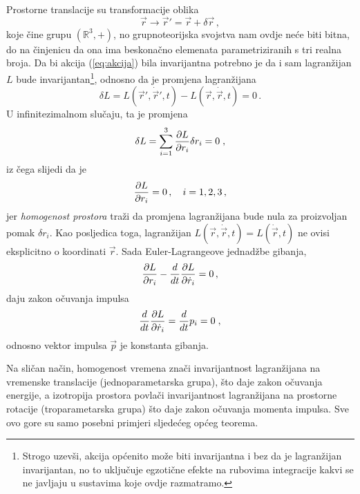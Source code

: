 Prostorne translacije su transformacije oblika
\begin{equation}
\vec{r}\to\vec{r}'=\vec{r}+\delta\vec{r} \,,
\end{equation}
koje čine grupu $(\mathbb{R}^{3},+)$, no grupnoteorijska svojstva nam ovdje
neće biti bitna, do na činjenicu da ona ima beskonačno elemenata parametriziranih
s tri realna broja. Da bi akcija (\ref{eq:akcija}) bila invarijantna potrebno
je da i sam lagranžijan $L$  bude invarijantan\footnote{Strogo uzevši, akcija
    općenito može biti invarijantna i bez da je lagranžijan invarijantan, no to uključuje
    egzotične efekte na rubovima integracije kakvi se ne javljaju u sustavima
    koje ovdje razmatramo.}, odnosno da je promjena lagranžijana
\begin{equation}
 \delta L = L(\vec{r}', \dot{\vec{r}}', t) -  L(\vec{r}, \dot{\vec{r}}, t)
 =0 \,.
\end{equation}
U infinitezimalnom slučaju, ta je promjena
\begin{equation}
    \delta L =  \sum_{i=1}^{3} \frac{\partial L}{\partial r_i} \delta r_i =0 \;,
\end{equation}
iz čega slijedi da je
\begin{equation}
 \frac{\partial L}{\partial r_i}=0 \,, \quad i=1,2,3 \,,
\end{equation}
jer \emph{homogenost prostora} traži da promjena lagranžijana bude nula
za proizvoljan pomak $\delta r_i$.  Kao posljedica toga, lagranžijan
$L(\vec{r},\dot{\vec{r}},t)=L(\dot{\vec{r}},t)$ ne ovisi eksplicitno
o koordinati $\vec{r}$.
Sada Euler-Lagrangeove jednadžbe gibanja,
  
\begin{equation}
  \frac{\partial L}{\partial r_i}-\frac{d}{d t} \frac{\partial L}{\partial \dot{r}_i}=0 \,,
\end{equation}
daju zakon očuvanja impulsa
\begin{equation}
\frac{d}{d t} \frac{\partial L}{\partial \dot{r}_i}=
\frac{d}{d t} p_i =0  \;,
\end{equation}
odnosno vektor impulsa $\vec{p}$ je konstanta gibanja.

Na sličan način, homogenost vremena znači invarijantnost lagranžijana
na vremenske translacije (jednoparametarska grupa),
što daje zakon očuvanja energije, a izotropija prostora povlači
invarijantnost lagranžijana na prostorne rotacije (troparametarska
grupa) što daje zakon očuvanja momenta impulsa.
Sve ovo gore su samo posebni primjeri sljedećeg općeg teorema.

